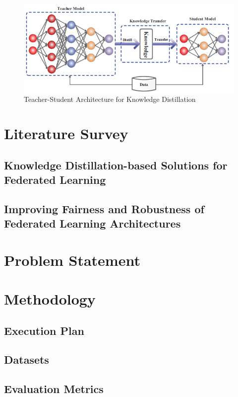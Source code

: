 \documentclass[conference]{IEEEtran}
\begin{document}
\begin{figure}[htbp]
\centering
\includegraphics[scale=0.5]{Knowledge_Distillation.png}
\caption{Teacher-Student Architecture for Knowledge Distillation \cite{b3}}
\label{fig}
\end{figure}

\section{Literature Survey}

\subsection{Knowledge Distillation-based Solutions for Federated Learning}

\subsection{Improving Fairness and Robustness of Federated Learning Architectures}

\section{Problem Statement}

\section{Methodology}
\subsection{Execution Plan}
\subsection{Datasets}
\subsection{Evaluation Metrics}
\end{document}
